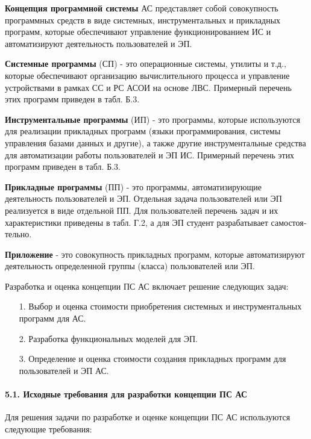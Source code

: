 \documentclass[12pt, a4paper, simple]{eskdtext}
\begin{document}
    \textbf{Концепция программной системы} АС представляет собой совокупность программных средств в виде системных,
    инструментальных и прикладных программ,
    которые обеспечивают управление функциони­рованием ИС и автоматизируют деятельность пользователей и ЭП. 
    
    \textbf{Системные программы} (СП) - это операционные системы, утилиты и т.д.,
    которые обес­печивают орга­низацию вычислительного процесса и управление устройствами в рамках СС и РС АСОИ на основе ЛВС.
    Пример­ный пе­речень этих программ приведен в табл. Б.3. 
    
    \textbf{Инструментальные программы} (ИП) - это программы, которые используются для реали­зации приклад­ных программ
    (языки программирования, системы управления ба­зами данных и дру­гие),
    а также дру­гие инст­рументальные средства для автоматизации работы пользователей и ЭП ИС.
    Пример­ный пе­ре­чень этих программ приве­ден в табл. Б.3.
    
    \textbf{Прикладные программы} (ПП) - это программы, автоматизирующие деятельность пользователей и ЭП.
    Отдельная задача пользователей или ЭП реализуется в виде отдельной ПП.
    Для пользователей перечень задач и их характе­ристики приведены в табл. Г.2, а для ЭП студент разрабатывает самостоя­тельно.
    
    \textbf{Приложение} - это совокупность прикладных программ,
    которые автоматизируют деятельность опреде­ленной группы (класса) пользователей или ЭП.
   
    Разработка и оценка концепции ПС АС  включает решение следующих задач:
    \begin{enumerate}
        \item[1.] Выбор и оценка стоимости приобретения системных и инструментальных программ для АС.
        \item[2.] Разработка функциональных моделей для ЭП.
        \item[3.] Определение и оценка стоимости создания приклад­ных программ для пользователей и ЭП АС.
    \end{enumerate}

    \paragraph{5.1. Исходные требования для разработки концепции ПС АС} \hspace{0pt}
    
    Для решения задачи по разработке и оценке концепции ПС АС используются следующие требования:
\end{document}
